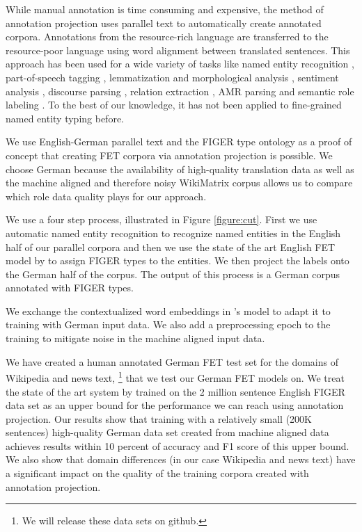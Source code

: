 \documentclass[11pt,a4paper]{article}
\begin{document}
While manual annotation is time consuming and expensive, the method of annotation projection \citep{Yaro:01a} uses parallel text to automatically create annotated corpora. Annotations from the resource-rich language are transferred to the resource-poor language using word alignment between translated sentences. This approach has been used for a wide variety of tasks like named entity recognition \cite{zhang2016bitext}, part-of-speech tagging \cite{huck2019cross}, lemmatization and morphological analysis \cite{nicolai2019learning}, sentiment analysis \cite{kajava2020emotion}, discourse parsing \cite{sluyter-gathje-etal-2020-shallow}, relation extraction \cite{kim2010cross}, AMR parsing \cite{damonte2018cross} and semantic role labeling \cite{pado2009cross}. To the best of our knowledge, it has not been applied to fine-grained named entity typing before. 

We use English-German parallel text and the FIGER type ontology \cite{ling2012fine} as a proof of concept that creating FET corpora via annotation projection is possible. We choose German because the availability of high-quality translation data as well as the machine aligned and therefore noisy WikiMatrix corpus \cite{schwenk2019wikimatrix} allows us to compare which role data quality plays for our approach.

We use a four step process, illustrated in Figure \ref{figure:cut}. First we use automatic named entity recognition to recognize named entities in the English half of our parallel corpora and then we use the state of the art English FET model by \citet{ChenCD20} to assign FIGER types to the entities. We then project the labels onto the German half of the corpus. The output of this process is a German corpus annotated with FIGER types.

We exchange the contextualized word embeddings in \citet{ChenCD20}'s model to adapt it to training with German input data. We also add a preprocessing epoch to the training to mitigate noise in the machine aligned input data. 

We have created a human annotated German FET test set for the domains of Wikipedia and news text, \footnote{We will release these data sets on github.} that we test our German FET models on. We treat the state of the art system by \citet{ChenCD20} trained on the 2 million sentence English FIGER data set as an upper bound for the performance we can reach using annotation projection. Our results show that training with a relatively small (200K sentences) high-quality German data set created from machine aligned data achieves results within 10 percent of accuracy and F1 score of this upper bound. We also show that domain differences (in our case Wikipedia and news text) have a significant impact on the quality of the training corpora created with annotation projection.
\end{document}
